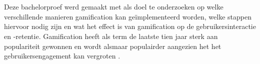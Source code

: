 
%
%

%



\chapter*{}

Deze bachelorproef werd gemaakt met als doel te onderzoeken op welke verschillende manieren gamification kan geïmplementeerd worden, welke stappen hiervoor nodig zijn en wat het effect is van gamification op de gebruikersinteractie en -retentie. Gamification heeft als term de laatste tien jaar sterk aan populariteit gewonnen en wordt alsmaar populairder aangezien het het gebruikersengagement kan vergroten \autocite{Deterding20112}.

